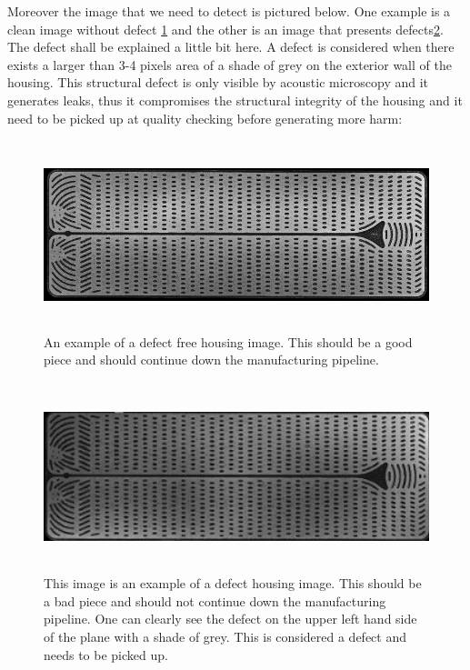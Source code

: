 \documentclass[12pt,a4paper,twoside]{report}
\begin{document}
Moreover the image that we need to detect is pictured below. One example is a clean image without defect \ref{fig:exemplu1} and the other is an image that presents defects\ref{fig:exemplu2}. The defect shall be explained a little bit here. A defect is considered when there exists a larger than 3-4 pixels area of a shade of grey on the exterior wall of the housing. This structural defect is only visible by acoustic microscopy and it generates leaks, thus it compromises the structural integrity of the housing and it need to be picked up at quality checking before generating more harm:

\begin{figure}[h!]
	\centering
	\includegraphics[width=13cm, height=5.5cm]{img/data/good_ex1.jpg}
	\caption[]
	{An example of a defect free housing image. This should be a good piece and should continue down the manufacturing pipeline.}
	\label{fig:exemplu1}
\end{figure}\par


\begin{figure}[h!]
	\centering
	\includegraphics[width=13cm, height=5.5cm]{img/data/exemplu_imagine2.jpg}
	\caption[]
	{This image is an example of a defect housing image. This should be a bad piece and should not continue down the manufacturing pipeline. One can clearly see the defect on the upper left hand side of the plane with a shade of grey. This is considered a defect and needs to be picked up.}
	\label{fig:exemplu2}
\end{figure}\par
\end{document}
